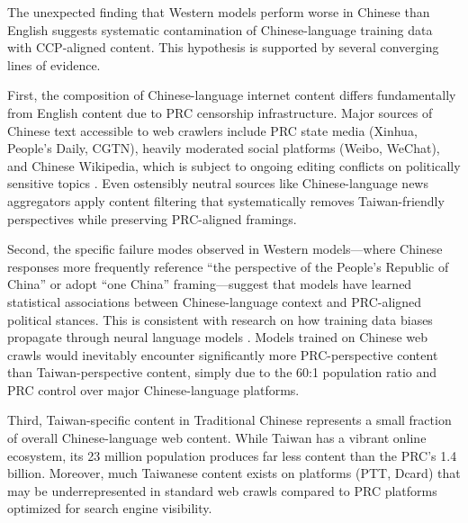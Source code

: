 \documentclass[11pt,a4paper]{article}
\begin{document}
The unexpected finding that Western models perform worse in Chinese than English suggests systematic contamination of Chinese-language training data with CCP-aligned content. This hypothesis is supported by several converging lines of evidence.

First, the composition of Chinese-language internet content differs fundamentally from English content due to PRC censorship infrastructure. Major sources of Chinese text accessible to web crawlers include PRC state media (Xinhua, People's Daily, CGTN), heavily moderated social platforms (Weibo, WeChat), and Chinese Wikipedia, which is subject to ongoing editing conflicts on politically sensitive topics \citep{xu2024censorship}. Even ostensibly neutral sources like Chinese-language news aggregators apply content filtering that systematically removes Taiwan-friendly perspectives while preserving PRC-aligned framings.

Second, the specific failure modes observed in Western models---where Chinese responses more frequently reference ``the perspective of the People's Republic of China'' or adopt ``one China'' framing---suggest that models have learned statistical associations between Chinese-language context and PRC-aligned political stances. This is consistent with research on how training data biases propagate through neural language models \citep{feng2023pretraining}. Models trained on Chinese web crawls would inevitably encounter significantly more PRC-perspective content than Taiwan-perspective content, simply due to the 60:1 population ratio and PRC control over major Chinese-language platforms.

Third, Taiwan-specific content in Traditional Chinese represents a small fraction of overall Chinese-language web content. While Taiwan has a vibrant online ecosystem, its 23 million population produces far less content than the PRC's 1.4 billion. Moreover, much Taiwanese content exists on platforms (PTT, Dcard) that may be underrepresented in standard web crawls compared to PRC platforms optimized for search engine visibility.
\end{document}
